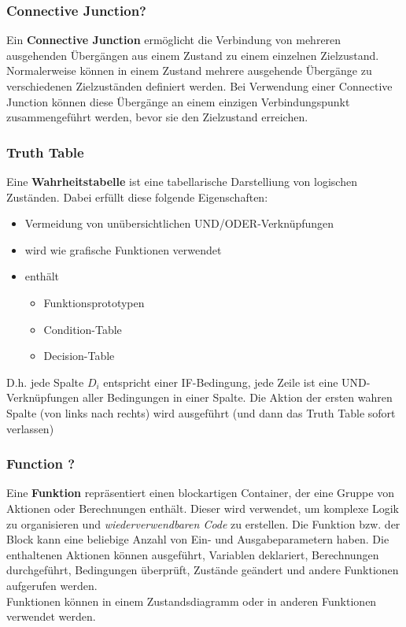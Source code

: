 \documentclass{article}
\begin{document}
\begin{multicols}{2}
			\subsubsection{Connective Junction?}
				Ein \textbf{Connective Junction} ermöglicht die Verbindung von mehreren ausgehenden Übergängen aus einem Zustand zu einem einzelnen Zielzustand.
				Normalerweise können in einem Zustand mehrere ausgehende Übergänge zu verschiedenen Zielzuständen definiert werden. Bei Verwendung einer Connective Junction können diese Übergänge an einem einzigen Verbindungspunkt zusammengeführt werden, bevor sie den Zielzustand erreichen.
			\subsubsection{Truth Table}
				Eine \textbf{Wahrheitstabelle} ist eine tabellarische Darstelliung von logischen Zuständen. Dabei erfüllt diese folgende Eigenschaften:
				\begin{itemize}
					\item Vermeidung von unübersichtlichen UND/ODER-Verknüpfungen
					\item wird wie grafische Funktionen verwendet
					\item enthält
					\begin{itemize}
						\item Funktionsprototypen 
						\item Condition-Table
						\item Decision-Table
					\end{itemize}
				\end{itemize}
				D.h. jede Spalte $D_i$ entspricht einer IF-Bedingung, jede Zeile ist eine UND-Verknüpfungen aller Bedingungen in einer Spalte.
				Die Aktion der ersten wahren Spalte (von links nach rechts) wird ausgeführt (und dann das Truth Table sofort verlassen)
			\subsubsection{Function ?}
				Eine \textbf{Funktion} repräsentiert einen blockartigen Container, der eine Gruppe von Aktionen oder Berechnungen enthält. Dieser wird verwendet, um komplexe Logik zu organisieren und \textit{wiederverwendbaren Code} zu erstellen.
				Die Funktion bzw. der Block kann eine beliebige Anzahl von Ein- und Ausgabeparametern haben. Die enthaltenen Aktionen können ausgeführt, Variablen deklariert, Berechnungen durchgeführt, Bedingungen überprüft, Zustände geändert und andere Funktionen aufgerufen werden.\\
				Funktionen können in einem Zustandsdiagramm oder in anderen Funktionen verwendet werden.

\end{multicols}
\end{document}
